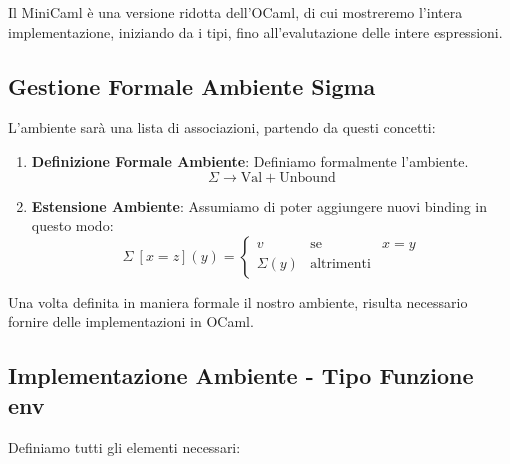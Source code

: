 \documentclass{article}
\begin{document}
Il MiniCaml è una versione ridotta dell'OCaml, di cui mostreremo l'intera implementazione, iniziando da i tipi, fino all'evalutazione delle intere espressioni.

\subsection{Gestione Formale Ambiente Sigma}

L'ambiente sarà una lista di associazioni, partendo da questi concetti:

\vspace*{12px}

\begin{enumerate}
    \item \textbf{Definizione Formale Ambiente}: Definiamo formalmente l'ambiente.
    \[ \Sigma \rightarrow \text{Val} + \text{Unbound} \]
    \vspace*{6px}
    \item \textbf{Estensione Ambiente}: Assumiamo di poter aggiungere nuovi binding in questo modo:
    \[  
    \Sigma \: [x=z] (y) = \left\{ 
    \begin{array}{rcl} v & \mbox{se} & x = y \\
                        \Sigma(y) & \mbox{altrimenti}
\end{array}\right.
    \]
\end{enumerate}

\vspace*{12px}

Una volta definita in maniera formale il nostro ambiente, risulta necessario fornire delle implementazioni in OCaml.

\newpage

\subsection{Implementazione Ambiente - Tipo Funzione env}

Definiamo tutti gli elementi necessari:
\end{document}
